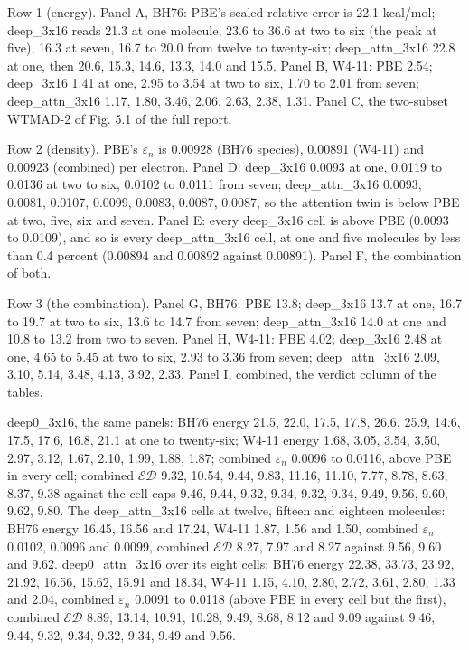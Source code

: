 \documentclass[10pt,a4paper]{article}
\begin{document}
Row 1 (energy). Panel A, BH76: PBE's scaled relative error is 22.1 kcal/mol; deep\_3x16 reads 21.3 at one molecule, 23.6 to 36.6 at two to six (the peak at five), 16.3 at seven, 16.7 to 20.0 from twelve to twenty-six; deep\_attn\_3x16 22.8 at one, then 20.6, 15.3, 14.6, 13.3, 14.0 and 15.5. Panel B, W4-11: PBE 2.54; deep\_3x16 1.41 at one, 2.95 to 3.54 at two to six, 1.70 to 2.01 from seven; deep\_attn\_3x16 1.17, 1.80, 3.46, 2.06, 2.63, 2.38, 1.31. Panel C, the two-subset WTMAD-2 of Fig. 5.1 of the full report.

Row 2 (density). PBE's $\varepsilon_n$ is 0.00928 (BH76 species), 0.00891 (W4-11) and 0.00923 (combined) per electron. Panel D: deep\_3x16 0.0093 at one, 0.0119 to 0.0136 at two to six, 0.0102 to 0.0111 from seven; deep\_attn\_3x16 0.0093, 0.0081, 0.0107, 0.0099, 0.0083, 0.0087, 0.0087, so the attention twin is below PBE at two, five, six and seven. Panel E: every deep\_3x16 cell is above PBE (0.0093 to 0.0109), and so is every deep\_attn\_3x16 cell, at one and five molecules by less than 0.4 percent (0.00894 and 0.00892 against 0.00891). Panel F, the combination of both.

Row 3 (the combination). Panel G, BH76: PBE 13.8; deep\_3x16 13.7 at one, 16.7 to 19.7 at two to six, 13.6 to 14.7 from seven; deep\_attn\_3x16 14.0 at one and 10.8 to 13.2 from two to seven. Panel H, W4-11: PBE 4.02; deep\_3x16 2.48 at one, 4.65 to 5.45 at two to six, 2.93 to 3.36 from seven; deep\_attn\_3x16 2.09, 3.10, 5.14, 3.48, 4.13, 3.92, 2.33. Panel I, combined, the verdict column of the tables.

deep0\_3x16, the same panels: BH76 energy 21.5, 22.0, 17.5, 17.8, 26.6, 25.9, 14.6, 17.5, 17.6, 16.8, 21.1 at one to twenty-six; W4-11 energy 1.68, 3.05, 3.54, 3.50, 2.97, 3.12, 1.67, 2.10, 1.99, 1.88, 1.87; combined $\varepsilon_n$ 0.0096 to 0.0116, above PBE in every cell; combined $\mathcal{ED}$ 9.32, 10.54, 9.44, 9.83, 11.16, 11.10, 7.77, 8.78, 8.63, 8.37, 9.38 against the cell caps 9.46, 9.44, 9.32, 9.34, 9.32, 9.34, 9.49, 9.56, 9.60, 9.62, 9.80. The deep\_attn\_3x16 cells at twelve, fifteen and eighteen molecules: BH76 energy 16.45, 16.56 and 17.24, W4-11 1.87, 1.56 and 1.50, combined $\varepsilon_n$ 0.0102, 0.0096 and 0.0099, combined $\mathcal{ED}$ 8.27, 7.97 and 8.27 against 9.56, 9.60 and 9.62. deep0\_attn\_3x16 over its eight cells: BH76 energy 22.38, 33.73, 23.92, 21.92, 16.56, 15.62, 15.91 and 18.34, W4-11 1.15, 4.10, 2.80, 2.72, 3.61, 2.80, 1.33 and 2.04, combined $\varepsilon_n$ 0.0091 to 0.0118 (above PBE in every cell but the first), combined $\mathcal{ED}$ 8.89, 13.14, 10.91, 10.28, 9.49, 8.68, 8.12 and 9.09 against 9.46, 9.44, 9.32, 9.34, 9.32, 9.34, 9.49 and 9.56.
\end{document}
